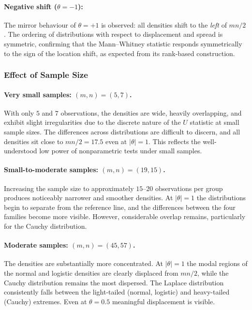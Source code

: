 \documentclass[10pt]{article}
\begin{document}
\paragraph{Negative shift ($\theta = -1$):}
The mirror behaviour of $\theta = +1$ is observed: all densities shift to the
\emph{left} of $mn/2$.  The ordering of distributions with respect to displacement
and spread is symmetric, confirming that the Mann--Whitney statistic responds
symmetrically to the sign of the location shift, as expected from its rank-based
construction.

\subsubsection{Effect of Sample Size}

\paragraph{Very small samples: $(m,n)=(5,7)$.}
With only $5$ and $7$ observations, the densities are wide, heavily overlapping,
and exhibit slight irregularities due to the discrete nature of the $U$ statistic
at small sample sizes.  The differences across distributions are difficult to
discern, and all densities sit close to $mn/2 = 17.5$ even at $|\theta|=1$.
This reflects the well-understood low power of nonparametric tests under small
samples.

\paragraph{Small-to-moderate samples: $(m,n)=(19,15)$.}
Increasing the sample size to approximately $15$--$20$ observations per group
produces noticeably narrower and smoother densities.  At $|\theta|=1$ the
distributions begin to separate from the reference line, and the differences
between the four families become more visible.  However, considerable overlap
remains, particularly for the Cauchy distribution.

\paragraph{Moderate samples: $(m,n)=(45,57)$.}
The densities are substantially more concentrated.  At $|\theta|=1$ the modal
regions of the normal and logistic densities are clearly displaced from $mn/2$,
while the Cauchy distribution remains the most dispersed.  The Laplace distribution
consistently falls between the light-tailed (normal, logistic) and heavy-tailed
(Cauchy) extremes.  Even at $\theta=0.5$ meaningful displacement is visible.
\end{document}
